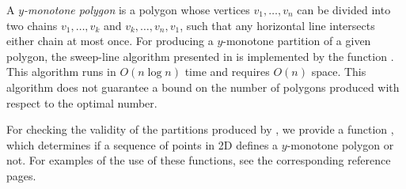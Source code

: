 A {\em $y$-monotone polygon}
is a polygon whose vertices $v_1, \ldots, v_n$ can be divided into two chains 
$v_1, \ldots, v_k$ and $v_k, \ldots, v_n, v_1$, such that any horizontal line 
intersects either chain at most once.  For producing a $y$-monotone partition 
of a given polygon, the sweep-line algorithm 
presented in \cite{bkos-cgaa-97} is implemented by the function
.  
This algorithm runs in $O(n \log n)$ time and requires $O(n)$ space.
This algorithm does not guarantee a bound on the number of polygons 
produced with respect to the optimal number.

For checking the validity of the partitions produced by 
, we provide a function , 
which determines if a sequence of points in 2D defines a $y$-monotone
polygon or not.  For examples of the use of these functions, see the
corresponding reference pages.
